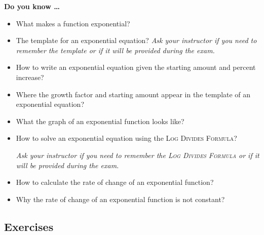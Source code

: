 
 
 
\noindent \textbf{Do you know \ldots}

\begin{itemize} 
\item What makes a function exponential? 
\item The template for an exponential equation? \emph{Ask your instructor if you need to remember the template or if it will be provided during the exam.} 
\item How to write an exponential equation given the starting amount and percent increase?     
\item Where the growth factor and starting amount appear in the template of an exponential equation?  
\item What the graph of an exponential function looks like?  
\item How to solve an exponential equation using the \textsc{Log Divides Formula}?   

\emph{Ask your instructor if you need to remember the \textsc{Log Divides Formula} or if it will be provided during the exam.}  
\item How to calculate the rate of change of an exponential function?     
\item Why the rate of change of an exponential function is not constant?     
\end{itemize}

\subsection*{Exercises}

